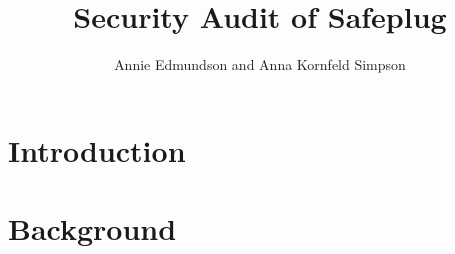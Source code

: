 \documentclass[12pt, letterpaper]{article}
\title{Security Audit of Safeplug}
\author{Annie Edmundson and Anna Kornfeld Simpson}
\begin{document}
\maketitle

\section{Introduction}

\section{Background}


\end{document}
